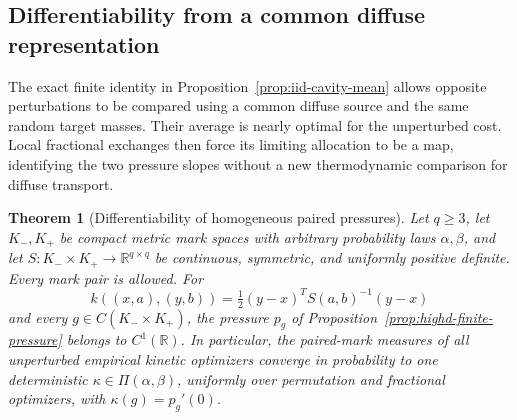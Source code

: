 \documentclass[11pt,reqno]{amsart}
\newtheorem{theorem}{Theorem}[section]
\theoremstyle{definition}
\theoremstyle{remark}
\numberwithin{equation}{section}
\newcommand{\R}{\mathbb R}
\begin{document}
\subsection{Differentiability from a common diffuse representation}
\label{subsec:highd-diffuse-pressure}

The exact finite identity in Proposition~\ref{prop:iid-cavity-mean}
allows opposite perturbations to be compared using a common diffuse
source and the same random target masses. Their average is nearly
optimal for the unperturbed cost. Local fractional exchanges then
force its limiting allocation to be a map, identifying the two pressure
slopes without a new thermodynamic comparison for diffuse transport.

\begin{theorem}[Differentiability of homogeneous paired pressures]
\label{thm:highd-pressure-differentiability}
Let \(q\ge3\), let \(K_-,K_+\) be compact metric mark spaces with
arbitrary probability laws \(\alpha,\beta\), and let
\(S:K_-\times K_+\to\R^{q\times q}\) be continuous, symmetric,
and uniformly positive definite. Every mark pair is allowed. For
\[
 k((x,a),(y,b))=\tfrac12(y-x)^TS(a,b)^{-1}(y-x)
\]
and every \(g\in C(K_-\times K_+)\), the pressure \(p_g\) of
Proposition~\ref{prop:highd-finite-pressure} belongs to \(C^1(\R)\).
In particular, the paired-mark measures of all unperturbed empirical
kinetic optimizers converge in probability to one deterministic
\(\kappa\in\Pi(\alpha,\beta)\), uniformly over permutation and
fractional optimizers, with \(\kappa(g)=p_g'(0)\).
\end{theorem}
\end{document}
